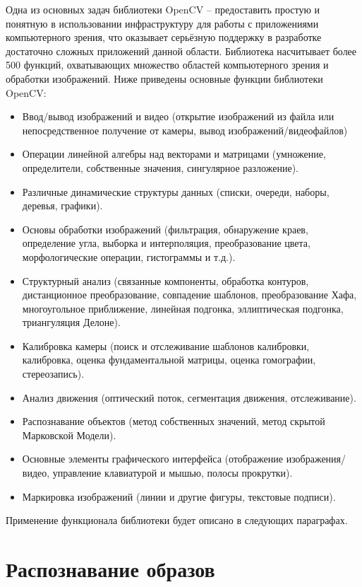 Одна из основных задач библиотеки OpenCV -- предоставить простую и понятную в использовании инфраструктуру для работы с приложениями компьютерного зрения, что оказывает серьёзную поддержку в разработке достаточно сложных приложений данной области. Библиотека насчитывает более 500 функций, охватывающих множество областей компьютерного зрения и обработки изображений. Ниже приведены основные функции библиотеки OpenCV:

\begin{itemize}
\setlength\itemsep{-0.5em}
\item Ввод/вывод изображений и видео (открытие изображений из файла или непосредственное получение от камеры, вывод изображений/видеофайлов)
\item Операции линейной алгебры над векторами и матрицами (умножение, определители, собственные значения, сингулярное разложение).
\item Различные динамические структуры данных (списки, очереди, наборы, деревья, графики).
\item Основы обработки изображений (фильтрация, обнаружение краев, определение угла, выборка и интерполяция, преобразование цвета, морфологические операции, гистограммы и т.д.).
\item Структурный анализ (связанные компоненты, обработка контуров, дистанционное преобразование, совпадение шаблонов, преобразование Хафа, многоугольное приближение, линейная подгонка, эллиптическая подгонка, триангуляция Делоне).
\item Калибровка камеры (поиск и отслеживание шаблонов калибровки, калибровка, оценка фундаментальной матрицы, оценка гомографии, стереозапись).
\item Анализ движения (оптический поток, сегментация движения, отслеживание).
\item Распознавание объектов (метод собственных значений, метод скрытой Марковской Модели).
\item Основные элементы графического интерфейса (отображение изображения/видео, управление клавиатурой и мышью, полосы прокрутки).
\item Маркировка изображений (линии и другие фигуры, текстовые подписи).
\end{itemize}

Применение функционала библиотеки будет описано в следующих параграфах.

\section{Распознавание образов}

